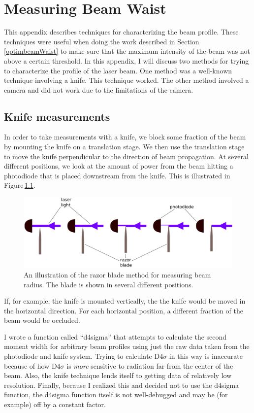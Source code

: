 \chapter{Measuring Beam Waist}
\label{BeamWaistAppendix}

This appendix describes techniques for characterizing the beam profile. These techniques were useful when doing the work described in Section\,\ref{optimbeamWaist} to make sure that the maximum intensity of the beam was not above a certain threshold. In this appendix, I will discuss two methods for trying to characterize the profile of the laser beam. One method was a well-known technique involving a knife. This technique worked. The other method involved a camera and did not work due to the limitations of the camera.  

\section{Knife measurements}
In order to take measurements with a knife, we block some fraction of the beam by mounting the knife on a translation stage. We then use the translation stage to move the knife perpendicular to the direction of beam propagation. At several different positions, we look at the amount of power from the beam hitting a photodiode that is placed downstream from the knife. This is illustrated in Figure\,\ref{knifeDiagram}.
\begin{figure}
\centering
\includegraphics[width=.85\textwidth]{knife_drawing}
\caption[Knife diagram]{\label{knifeDiagram} An illustration of the razor blade method for measuring beam radius. The blade is shown in several different positions.
}
\end{figure}
If, for example, the knife is mounted vertically, the the knife would be moved in the horizontal direction. For each horizontal position, a different fraction of the beam would be occluded. 

I wrote a function called ``d4sigma'' that attempts to calculate the second moment width for arbitrary beam profiles using just the raw data taken from the photodiode and knife system. Trying to calculate D4$\sigma$ in this way is inaccurate because of how D4$\sigma$ is \emph{more} sensitive to radiation far from the center of the beam. Also, the knife technique lends itself to getting data of relatively low resolution. Finally, because I realized this and decided not to use the d4sigma function, the d4sigma function itself is not well-debugged and may be (for example) off by a constant factor.

